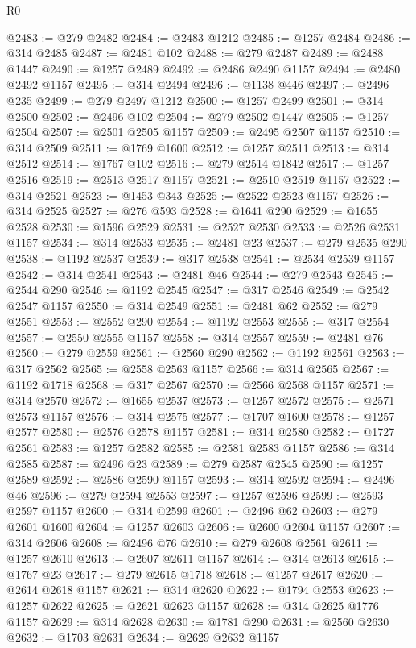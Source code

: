 \begin{lexlean}{R0}
\begin{coremodule}
@2483 := @279 @2482
@2484 := @2483 @1212
@2485 := @1257 @2484
@2486 := @314 @2485
@2487 := @2481 @102
@2488 := @279 @2487
@2489 := @2488 @1447
@2490 := @1257 @2489
@2492 := @2486 @2490 @1157
@2494 := @2480 @2492 @1157
@2495 := @314 @2494
@2496 := @1138 @446
@2497 := @2496 @235
@2499 := @279 @2497 @1212
@2500 := @1257 @2499
@2501 := @314 @2500
@2502 := @2496 @102
@2504 := @279 @2502 @1447
@2505 := @1257 @2504
@2507 := @2501 @2505 @1157
@2509 := @2495 @2507 @1157
@2510 := @314 @2509
@2511 := @1769 @1600
@2512 := @1257 @2511
@2513 := @314 @2512
@2514 := @1767 @102
@2516 := @279 @2514 @1842
@2517 := @1257 @2516
@2519 := @2513 @2517 @1157
@2521 := @2510 @2519 @1157
@2522 := @314 @2521
@2523 := @1453 @343
@2525 := @2522 @2523 @1157
@2526 := @314 @2525
@2527 := @276 @593
@2528 := @1641 @290
@2529 := @1655 @2528
@2530 := @1596 @2529
@2531 := @2527 @2530
@2533 := @2526 @2531 @1157
@2534 := @314 @2533
@2535 := @2481 @23
@2537 := @279 @2535 @290
@2538 := @1192 @2537
@2539 := @317 @2538
@2541 := @2534 @2539 @1157
@2542 := @314 @2541
@2543 := @2481 @46
@2544 := @279 @2543
@2545 := @2544 @290
@2546 := @1192 @2545
@2547 := @317 @2546
@2549 := @2542 @2547 @1157
@2550 := @314 @2549
@2551 := @2481 @62
@2552 := @279 @2551
@2553 := @2552 @290
@2554 := @1192 @2553
@2555 := @317 @2554
@2557 := @2550 @2555 @1157
@2558 := @314 @2557
@2559 := @2481 @76
@2560 := @279 @2559
@2561 := @2560 @290
@2562 := @1192 @2561
@2563 := @317 @2562
@2565 := @2558 @2563 @1157
@2566 := @314 @2565
@2567 := @1192 @1718
@2568 := @317 @2567
@2570 := @2566 @2568 @1157
@2571 := @314 @2570
@2572 := @1655 @2537
@2573 := @1257 @2572
@2575 := @2571 @2573 @1157
@2576 := @314 @2575
@2577 := @1707 @1600
@2578 := @1257 @2577
@2580 := @2576 @2578 @1157
@2581 := @314 @2580
@2582 := @1727 @2561
@2583 := @1257 @2582
@2585 := @2581 @2583 @1157
@2586 := @314 @2585
@2587 := @2496 @23
@2589 := @279 @2587 @2545
@2590 := @1257 @2589
@2592 := @2586 @2590 @1157
@2593 := @314 @2592
@2594 := @2496 @46
@2596 := @279 @2594 @2553
@2597 := @1257 @2596
@2599 := @2593 @2597 @1157
@2600 := @314 @2599
@2601 := @2496 @62
@2603 := @279 @2601 @1600
@2604 := @1257 @2603
@2606 := @2600 @2604 @1157
@2607 := @314 @2606
@2608 := @2496 @76
@2610 := @279 @2608 @2561
@2611 := @1257 @2610
@2613 := @2607 @2611 @1157
@2614 := @314 @2613
@2615 := @1767 @23
@2617 := @279 @2615 @1718
@2618 := @1257 @2617
@2620 := @2614 @2618 @1157
@2621 := @314 @2620
@2622 := @1794 @2553
@2623 := @1257 @2622
@2625 := @2621 @2623 @1157
@2628 := @314 @2625 @1776 @1157
@2629 := @314 @2628
@2630 := @1781 @290
@2631 := @2560 @2630
@2632 := @1703 @2631
@2634 := @2629 @2632 @1157

\end{coremodule}
\end{lexlean}
